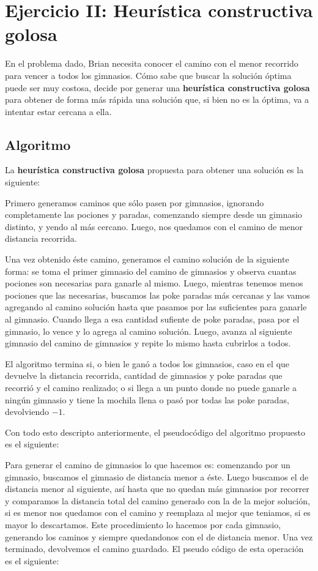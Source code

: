\section{Ejercicio II: Heurística constructiva golosa}

En el problema dado, Brian necesita conocer el camino con el menor recorrido para vencer a todos los gimnasios. Cómo sabe que buscar la solución óptima puede ser muy costosa, decide por generar una \textbf{heurística constructiva golosa} para obtener de forma más rápida una solución que, si bien no es la óptima, va a intentar estar cercana a ella.

\subsection{Algoritmo}

La \textbf{heurística constructiva golosa} propuesta para obtener una solución es la siguiente:

Primero generamos caminos que sólo pasen por gimnasios, ignorando completamente las pociones y paradas, comenzando siempre desde un gimnasio distinto, y yendo al más cercano. Luego, nos quedamos con el camino de menor distancia recorrida. 

Una vez obtenido éste camino, generamos el camino solución de la siguiente forma: se toma el primer gimnasio del camino de gimnasios y observa cuantas pociones son necesarias para ganarle al mismo. Luego, mientras tenemos menos pociones que las necesarias, buscamos las poke paradas más cercanas y las vamos agregando al camino solución hasta que pasamos por las suficientes para ganarle al gimnasio. Cuando llega a esa cantidad sufiente de poke paradas, pasa por el gimnasio, lo vence y lo agrega al camino solución. Luego, avanza al siguiente gimnasio del camino de gimnasios y repite lo mismo hasta cubrirlos a todos.

El algoritmo termina si, o bien le ganó a todos los gimnasios, caso en el que devuelve la distancia recorrida, cantidad de gimnasios y poke paradas que recorrió y el camino realizado; o si llega a un punto donde no puede ganarle a ningún gimnasio y tiene la mochila llena o pasó por todas las poke paradas, devolviendo $-1$.


Con todo esto descripto anteriormente, el pseudocódigo del algoritmo propuesto es el siguiente:

Para generar el camino de gimnasios lo que hacemos es: comenzando por un gimnasio, buscamos el gimnasio de distancia menor a éste. Luego buscamos el de distancia menor al siguiente, así hasta que no quedan más gimnasios por recorrer y comparamos la distancia total del camino generado con la de la mejor solución, si es menor nos quedamos con el camino y reemplaza al mejor que teniamos, si es mayor lo descartamos. Este procedimiento lo hacemos por cada gimnasio, generando los caminos y siempre quedandonos con el de distancia menor. Una vez terminado, devolvemos el camino guardado. El pseudo código de esta operación es el siguiente:


